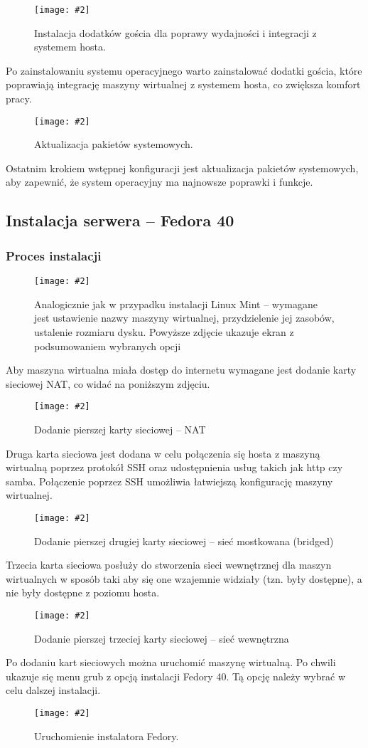 \documentclass[a4paper]{article}
\newcommand*{\zdj}[2][\textwidth]{\texttt{[image: \#2]}}
\newcommand*{\fg}[4][!htb]{
      \begin{figure*}[#1]
            \zdj{#2}
            \caption[#4]{#3}
      \end{figure*}
}
\begin{document}
\fg{contents/OS_installation/Linux_mint/9.png}{Instalacja dodatków gościa dla poprawy wydajności i integracji z systemem hosta.}{Instalacja dodatków gościa}

Po zainstalowaniu systemu operacyjnego warto zainstalować dodatki gościa, które poprawiają integrację maszyny wirtualnej z systemem hosta, co zwiększa komfort pracy.

\fg{contents/OS_installation/Linux_mint/10.png}{Aktualizacja pakietów systemowych.}{Aktualizacja pakietów}

Ostatnim krokiem wstępnej konfiguracji jest aktualizacja pakietów systemowych, aby zapewnić, że system operacyjny ma najnowsze poprawki i funkcje.
\newpage
\subsection{Instalacja serwera – Fedora 40}
\subsubsection{Proces instalacji}
\fg{contents/OS_installation/Fedora40/4.png}{Analogicznie jak w przypadku instalacji Linux Mint – wymagane jest ustawienie nazwy maszyny wirtualnej, przydzielenie jej zasobów, ustalenie rozmiaru dysku. Powyższe zdjęcie ukazuje ekran z podsumowaniem wybranych opcji}{Podsumowanie maszyny wirtualnej Fedora 40}
Aby maszyna wirtualna miała dostęp do internetu wymagane jest dodanie karty sieciowej NAT, co widać na poniższym zdjęciu.
\fg{contents/OS_installation/Fedora40/5.png}{Dodanie pierszej karty sieciowej – NAT}{Dodanie pierszej karty sieciowej}
\newpage
Druga karta sieciowa jest dodana w celu połączenia się hosta z maszyną wirtualną poprzez protokół SSH oraz udostępnienia usług takich jak http czy samba. Połączenie poprzez SSH umożliwia łatwiejszą konfigurację maszyny wirtualnej.
\fg{contents/OS_installation/Fedora40/6.png}{Dodanie pierszej drugiej karty sieciowej – sieć mostkowana (bridged)}{Dodanie drugiej karty sieciowej}

Trzecia karta sieciowa posłuży do stworzenia sieci wewnętrznej dla maszyn wirtualnych w sposób taki aby się one wzajemnie widziały (tzn. były dostępne), a nie były dostępne z poziomu hosta.
\fg{contents/OS_installation/Fedora40/7.png}{Dodanie pierszej trzeciej karty sieciowej – sieć wewnętrzna}{Dodanie trzeciej karty sieciowej}
\newpage
Po dodaniu kart sieciowych można uruchomić maszynę wirtualną. Po chwili ukazuje się menu grub z opcją instalacji Fedory 40. Tą opcję należy wybrać w celu dalszej instalacji.
\fg{contents/OS_installation/Fedora40/8.png}{Uruchomienie instalatora Fedory.}{Uruchomienie instalatora Fedory.}
\end{document}
